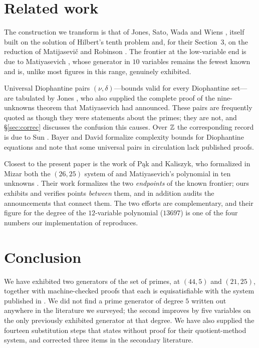 \section{Related work}
\label{sec:related}

The construction we transform is that of Jones, Sato, Wada and Wiens
\cite{jsww1976}, itself built on the solution of Hilbert's tenth problem
\cite{matiyasevich1970} and, for their Section~3, on the reduction of
Matijasevi\v{c} and Robinson \cite{mr1975}. The frontier at the low-variable end
is due to Matiyasevich \cite{matiyasevich1981}, whose generator in $10$
variables remains the fewest known and is, unlike most figures in this range,
genuinely exhibited.

Universal Diophantine pairs $(\nu,\delta)$---bounds valid for every Diophantine
set---are tabulated by Jones \cite{jones1982}, who also supplied the complete
proof of the nine-unknowns theorem that Matiyasevich had announced. These pairs
are frequently quoted as though they were statements about the primes; they are
not, and \S\ref{sec:correc} discusses the confusion this causes. Over $\mathbb{Z}$ the
corresponding record is due to Sun \cite{sun2021}. Bayer and David
\cite{bayerdavid2025} formalize complexity bounds for Diophantine equations and
note that some universal pairs in circulation lack published proofs.

Closest to the present paper is the work of P\k{a}k and Kaliszyk, who formalized
in Mizar both the $(26,25)$ system of \cite{jsww1976} \cite{pak2022jsww} and
Matiyasevich's polynomial in ten unknowns \cite{pak2022ten}. Their work
formalizes the two \emph{endpoints} of the known frontier; ours exhibits and
verifies points \emph{between} them, and in addition audits the announcements
that connect them. The two efforts are complementary, and their figure for the
degree of the $12$-variable polynomial ($13697$) is one of the four numbers our
implementation of \cite{mr1975} reproduces.

\section{Conclusion}
\label{sec:concl}

We have exhibited two generators of the set of primes, at $(44,5)$ and
$(21,25)$, together with machine-checked proofs that each is equisatisfiable
with the system published in \cite{jsww1976}. We did not find a prime generator of degree $5$ written out anywhere in the
literature we surveyed; the second improves by five variables on the only
previously exhibited generator at that degree. We have
also supplied the fourteen substitution steps that \cite{jsww1976} states
without proof for their quotient-method system, and corrected three items in the
secondary literature.

